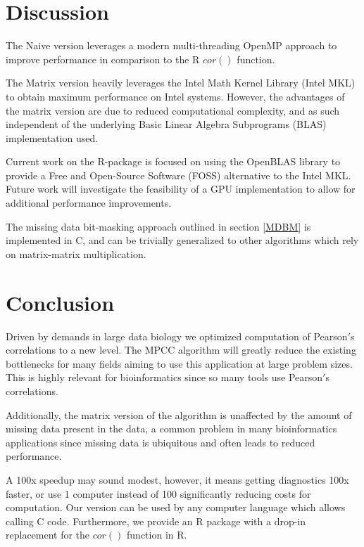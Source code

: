 \documentclass{bioinfo}
\begin{document}
\vspace*{-6pt}

\section{Discussion}
The Naive version leverages a modern multi-threading OpenMP approach 
to improve performance in comparison to the R $cor()$ function.

The Matrix version heavily leverages the Intel\textregistered{} Math Kernel 
Library (Intel\textregistered{} MKL) to obtain maximum performance 
on Intel\textregistered{} systems. However, the advantages of the 
matrix version are due to reduced computational complexity, and as 
such independent of the underlying Basic Linear Algebra Subprograms 
(BLAS) implementation used.

Current work on the R-package is focused on using the OpenBLAS 
library to provide a Free and Open-Source Software (FOSS) 
alternative to the Intel\textregistered{} MKL. Future work will 
investigate the feasibility of a GPU implementation to allow 
for additional performance improvements.

The missing data bit-masking approach outlined in section \ref{MDBM} 
is implemented in C, and can be trivially generalized to other 
algorithms which rely on matrix-matrix multiplication. \vspace*{-12pt}

\section{Conclusion}

Driven by demands in large data biology we optimized computation of Pearson$'$s 
correlations to a new level. The MPCC algorithm will greatly reduce the 
existing bottlenecks for many fields aiming to use this application at large 
problem sizes. This is highly relevant for bioinformatics since so many 
tools use Pearson$'$s correlations. 

Additionally, the matrix version of the algorithm is unaffected by the 
amount of missing data present in the data, a common problem in many 
bioinformatics applications since missing data is ubiquitous and often 
leads to reduced performance.

A 100x speedup may sound modest, however, it means getting diagnostics 100x 
faster, or use 1 computer instead of 100 significantly reducing costs for 
computation. Our version can be used by any computer language which allows 
calling C code. Furthermore, we provide an R package with a drop-in replacement 
for the $cor()$ function in R.
\end{document}
